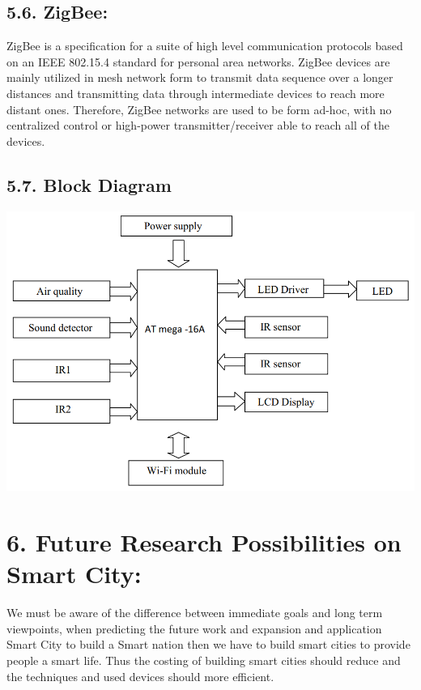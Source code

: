 \documentclass[a4paper]{report}
\begin{document}
	\subsection*{5.6. ZigBee:}
	ZigBee is a specification for a suite of high level communication protocols based on an IEEE 802.15.4 standard for
	personal area networks. ZigBee devices are mainly utilized in mesh network form to transmit data sequence over a
	longer distances and transmitting data through intermediate devices to reach more distant ones. Therefore, ZigBee
	networks are used to be form ad-hoc, with no centralized control or high-power transmitter/receiver able to reach
	all of the devices.
	
	\subsection*{5.7. Block Diagram}
	\begin{center}
		\includegraphics[scale=.5]{Capture.png}
	\end{center}
	
	
	
	\section*{6. Future Research Possibilities on Smart City:}
	We must be aware of the difference between immediate goals and long term viewpoints, when predicting the future work and expansion and application Smart City to build a Smart nation then we have to build smart cities to provide people a smart life. Thus the costing of building smart cities should reduce and the techniques and used devices should more efficient.
	
\end{document}
